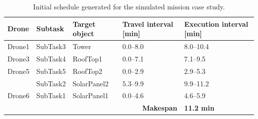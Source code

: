 \begin{table}[htbp]
\centering
\caption{Initial schedule generated for the simulated mission case study.}
\label{tab:first_schedule}
\begin{tabular}{lllll}
\toprule
Drone & Subtask & Target object & Travel interval [min] & Execution interval [min] \\
\midrule
Drone1 & SubTask3 & Tower       & 0.0--8.0 & 8.0--10.4 \\
Drone3 & SubTask4 & RoofTop1    & 0.0--7.1 & 7.1--9.5 \\
Drone5 & SubTask5 & RoofTop2    & 0.0--2.9 & 2.9--5.3 \\
       & SubTask2 & SolarPanel2 & 5.3--9.9 & 9.9--11.2 \\
Drone6 & SubTask1 & SolarPanel1 & 0.0--4.6 & 4.6--5.9 \\
\midrule
\multicolumn{4}{r}{\textbf{Makespan}} & \textbf{11.2 min} \\
\bottomrule
\end{tabular}
\end{table}